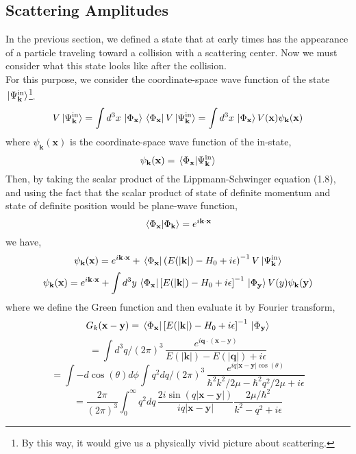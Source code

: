 \documentclass[12pt]{article}
\numberwithin{equation}{section}
\begin{document}
\subsection{Scattering Amplitudes}
In the previous section, we defined a state that at early times has the appearance of a particle traveling toward a collision with a scattering center. 
Now we must consider what this state looks like after the collision.
\\\indent For this purpose, we consider the coordinate-space wave function of the state $\ket*{\Psi_{\mathbf{k}}^{\text{in}}}$\footnote{By this way, it would give us a physically vivid picture about scattering.}.
\begin{equation}
    V\ket*{\Psi_{\mathbf{k}}^{\text{in}}} = \int{d^3x\,\ket*{\Phi_{\mathbf{x}}}\bra*{\Phi_{\mathbf{x}}}V\ket*{\Psi_{\mathbf{k}}^{\text{in}}}} = \int{d^3x\,\ket*{\Phi_{\mathbf{x}}}V(\mathbf{x})\psi_{\mathbf{k}}(\mathbf{x})}
\end{equation}
where $\psi_{\mathbf{k}}(\mathbf{x})$ is the coordinate-space wave function of the in-state,
\begin{equation}
    \psi_{\mathbf{k}}(\mathbf{x}) = \braket*{\Phi_{\mathbf{x}}}{\Psi_{\mathbf{k}}^{\text{in}}}
\end{equation}
Then, by taking the scalar product of the Lippmann-Schwinger equation (1.8), and using the fact that the scalar product of state of definite momentum and state of definite position would be plane-wave function,
\[\braket*{\Phi_{\mathbf{x}}}{\Phi_{\mathbf{k}}} = e^{i\mathbf{k}\cdot\mathbf{x}}\]
we have,
\[\psi_{\mathbf{k}}(\mathbf{x}) = e^{i\mathbf{k}\cdot\mathbf{x}} + \bra*{\Phi_{\mathbf{x}}}\left(E(|\mathbf{k}|)-H_0+i\epsilon\right)^{-1}V\ket*{\Psi_{\mathbf{k}}^{\text{in}}}\]
\begin{equation}
    \psi_{\mathbf{k}}(\mathbf{x}) = e^{i\mathbf{k}\cdot\mathbf{x}} + \int{d^3y\,\bra*{\Phi_{\mathbf{x}}}\left[E(|\mathbf{k}|)-H_0+i\epsilon\right]^{-1}\ket*{\Phi_{\mathbf{y}}}V(y)\psi_{\mathbf{k}}(\mathbf{y})}
\end{equation}
where we define the Green function and then evaluate it by Fourier transform,
\[
    G_{k}(\mathbf{x}-\mathbf{y}) = \bra*{\Phi_{\mathbf{x}}}\left[E(|\mathbf{k}|)-H_0+i\epsilon\right]^{-1}\ket*{\Phi_{\mathbf{y}}}
\]
\[ = \int{d^3q/(2\pi)^3\,\frac{e^{i\mathbf{q}\cdot(\mathbf{x}-\mathbf{y})}}{E(|\mathbf{k}|)-E(|\mathbf{q}|)+i\epsilon}}\]
\[=\int{-d\cos(\theta) d\phi}\int{q^2dq/(2\pi)^3\,\frac{e^{iq|\mathbf{x}-\mathbf{y}|\cos(\theta)}}{\hbar^2k^2/2\mu-\hbar^2q^2/2\mu+i\epsilon}}\]
\[ = \frac{2\pi}{(2\pi)^3}\int_{0}^{\infty}{q^2dq\,\frac{2i\sin(q|\mathbf{x}-\mathbf{y}|)}{iq|\mathbf{x}-\mathbf{y}|}\frac{2\mu/\hbar^2}{k^2-q^2+i\epsilon}}\]
\end{document}
